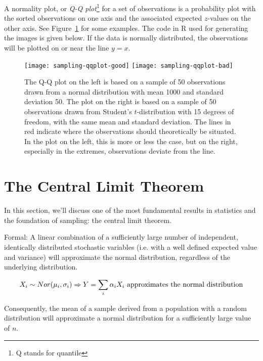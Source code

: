 \begin{definition}
    \label{def:qq-plot}
    A normality plot, or \emph{Q-Q plot}\footnote{Q stands for quantile} for a set of observations is a probability plot with the sorted observations on one axis and the associated expected $z$-values on the other axis. See Figure~\ref{fig:qqplot} for some examples. The code in R used for generating the images is given below. If the data is normally distributed, the observations will be plotted on or near the line $y = x$.
  \end{definition}

\begin{figure}
  \begin{center}
    \texttt{[image: sampling-qqplot-good]}
    \texttt{[image: sampling-qqplot-bad]}
  \end{center}
  \caption{The Q-Q plot on the left is based on a sample of 50 observations drawn from a normal distribution with mean 1000 and standard deviation 50. The plot on the right is based on a sample of 50 observations drawn from Student's $t$-distribution with 15 degrees of freedom, with the same mean and standard deviation. The lines in red indicate where the observations should theoretically be situated. In the plot on the left, this is more or less the case, but on the right, especially in the extremes, observations deviate from the line.}
  \label{fig:qqplot}
\end{figure}



\section{The Central Limit Theorem}
\label{sec:central-limit-theorem}

In this section, we'll discuss one of the most fundamental results in statistics and the foundation of sampling: the central limit theorem.

\begin{definition}
  Formal: A linear combination of a sufficiently large number of independent, identically distributed stochastic variables (i.e. with a well defined expected value and variance) will approximate the normal distribution, regardless of the underlying distribution.

  \[X_{i} \sim Nor(\mu_{i}, \sigma_{i}) \Rightarrow Y = \sum_{i} \alpha_{i} X_{i} \textnormal{ approximates the normal distribution} \]

  Consequently, the mean of a sample derived from a population with a random distribution will approximate a normal distribution for a sufficiently large value of $n$.
\end{definition}

